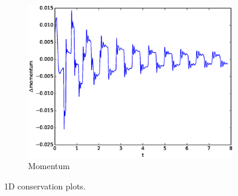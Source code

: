 \begin{figure}[h!]
\begin{subfigure}[b]{0.32\textwidth}
        \centering
        \includegraphics[width=\textwidth]{images/Mo1d.eps}\hfill
        \caption{Momentum}
        \label{Momentum}
    \end{subfigure}
    \caption{1D conservation plots.}
    \label{fig:three graphs}
\end{figure}







